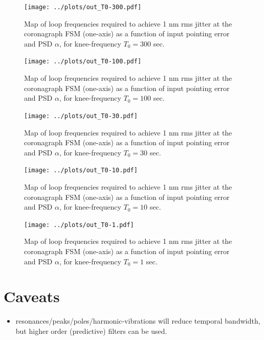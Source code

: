 \documentclass[10pt,preprint]{aastex631}
\begin{document}
\begin{figure}
\centering
\texttt{[image: ../plots/out\_T0-300.pdf]}
\caption{Map of loop frequencies required to achieve 1 nm rms jitter at the coronagraph FSM (one-axis) as a function of input pointing error and PSD $\alpha$, for knee-frequency $T_0 = 300$ sec.  \label{fig:T0-300}}
\end{figure}

\begin{figure}
\centering
\texttt{[image: ../plots/out\_T0-100.pdf]}
\caption{Map of loop frequencies required to achieve 1 nm rms jitter at the coronagraph FSM (one-axis) as a function of input pointing error and PSD $\alpha$, for knee-frequency $T_0 = 100$ sec.  \label{fig:T0-100}}
\end{figure}

\begin{figure}
\centering
\texttt{[image: ../plots/out\_T0-30.pdf]}
\caption{Map of loop frequencies required to achieve 1 nm rms jitter at the coronagraph FSM (one-axis) as a function of input pointing error and PSD $\alpha$, for knee-frequency $T_0 = 30$ sec.  \label{fig:T0-30}}
\end{figure}

\begin{figure}
\centering
\texttt{[image: ../plots/out\_T0-10.pdf]}
\caption{Map of loop frequencies required to achieve 1 nm rms jitter at the coronagraph FSM (one-axis) as a function of input pointing error and PSD $\alpha$, for knee-frequency $T_0 = 10$ sec.  \label{fig:T0-10}}
\end{figure}

\begin{figure}
\centering
\texttt{[image: ../plots/out\_T0-1.pdf]}
\caption{Map of loop frequencies required to achieve 1 nm rms jitter at the coronagraph FSM (one-axis) as a function of input pointing error and PSD $\alpha$, for knee-frequency $T_0 = 1$ sec.  \label{fig:T0-1}}
\end{figure}


\section{Caveats}

\begin{itemize}
\item resonances/peaks/poles/harmonic-vibrations will reduce temporal bandwidth, but higher order (predictive) filters can be used.  \\
\end{itemize}



\end{document}

